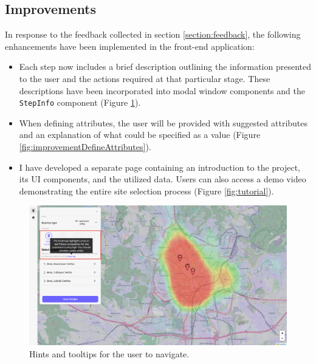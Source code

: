 \subsection{Improvements}

In response to the feedback collected in section \ref{section:feedback}, the following enhancements have been implemented in the front-end application:

\begin{itemize}
    \item Each step now includes a brief description outlining the information presented to the user and the actions required at that particular stage. These descriptions have been incorporated into modal window components and the \texttt{StepInfo} component (Figure \ref{fig:improvementHints}).

    \item When defining attributes, the user will be provided with suggested attributes and an explanation of what could be specified as a value (Figure \ref{fig:improvementDefineAttributes}).

    \item I have developed a separate page containing an introduction to the project, its UI components, and the utilized data. Users can also access a demo video demonstrating the entire site selection process (Figure \ref{fig:tutorial}).
\end{itemize}

\begin{figure}[ht]\centering
  \centering
  \includegraphics[width=0.9\linewidth]{obrazky-figures/ch7/improvement-hints.png}
  \caption{Hints and tooltips for the user to navigate.}
  \label{fig:improvementHints}
\end{figure}

